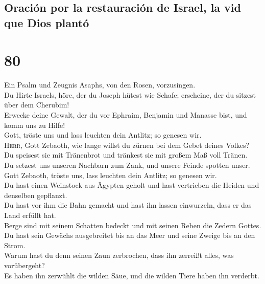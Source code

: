 \hypertarget{oraciuxf3n-por-la-restauraciuxf3n-de-israel-la-vid-que-dios-plantuxf3}{%
\subsection{Oración por la restauración de Israel, la vid que Dios
plantó}\label{oraciuxf3n-por-la-restauraciuxf3n-de-israel-la-vid-que-dios-plantuxf3}}

\hypertarget{section-79}{%
\section{80}\label{section-79}}

 Ein Psalm und Zeugnis Asaphs, von den Rosen,
vorzusingen.\\
 Du Hirte Israels, höre, der du Joseph hütest wie Schafe;
erscheine, der du sitzest über dem Cherubim!\\
 Erwecke deine Gewalt, der du vor Ephraim, Benjamin und
Manasse bist, und komm uns zu Hilfe!\\
 Gott, tröste uns und lass leuchten dein Antlitz; so
genesen wir.\\
 \textsc{Herr}, Gott Zebaoth, wie lange willst du zürnen
bei dem Gebet deines Volkes?\\
 Du speisest sie mit Tränenbrot und tränkest sie mit
großem Maß voll Tränen.\\
 Du setzest uns unseren Nachbarn zum Zank, und unsere
Feinde spotten unser.\\
 Gott Zebaoth, tröste uns, lass leuchten dein Antlitz; so
genesen wir.\\
 Du hast einen Weinstock aus Ägypten geholt und hast
vertrieben die Heiden und denselben gepflanzt.\\
 Du hast vor ihm die Bahn gemacht und hast ihn lassen
einwurzeln, dass er das Land erfüllt hat.\\
 Berge sind mit seinem Schatten bedeckt und mit seinen
Reben die Zedern Gottes.\\
 Du hast sein Gewächs ausgebreitet bis an das Meer und
seine Zweige bis an den Strom.\\
 Warum hast du denn seinen Zaun zerbrochen, dass ihn
zerreißt alles, was vorübergeht?\\
 Es haben ihn zerwühlt die wilden Säue, und die wilden
Tiere haben ihn verderbt.\\
